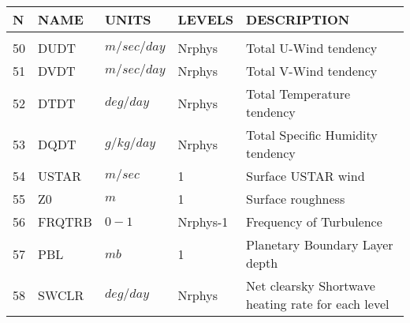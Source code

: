 \newpage
\vspace*{\fill}
\begin{tabular}{lllll}
\hline\hline
N & NAME & UNITS & LEVELS & DESCRIPTION \\
\hline

&\\
50 & DUDT     &    $m/sec/day$ &  Nrphys
         &\begin{minipage}[t]{3in}
          {Total U-Wind tendency}
         \end{minipage}\\
51 & DVDT     &    $m/sec/day$ &  Nrphys
         &\begin{minipage}[t]{3in}
          {Total V-Wind tendency}
         \end{minipage}\\
52 & DTDT     &    $deg/day$ &  Nrphys
         &\begin{minipage}[t]{3in}
          {Total Temperature tendency}
         \end{minipage}\\
53 & DQDT     &    $g/kg/day$ &  Nrphys
         &\begin{minipage}[t]{3in}
          {Total Specific Humidity tendency}
         \end{minipage}\\
54 & USTAR    &    $m/sec$ &  1
         &\begin{minipage}[t]{3in}
          {Surface USTAR wind}
         \end{minipage}\\
55 & Z0       &    $m$ &  1
         &\begin{minipage}[t]{3in}
          {Surface roughness}
         \end{minipage}\\
56 & FRQTRB   &    $0-1$ &  Nrphys-1
         &\begin{minipage}[t]{3in}
          {Frequency of Turbulence}
         \end{minipage}\\
57 & PBL      &    $mb$ &  1
         &\begin{minipage}[t]{3in}
          {Planetary Boundary Layer depth}
         \end{minipage}\\
58 & SWCLR    &  $deg/day$ &  Nrphys 
         &\begin{minipage}[t]{3in}
          {Net clearsky Shortwave heating rate for each level}
         \end{minipage}\\

\end{tabular}
